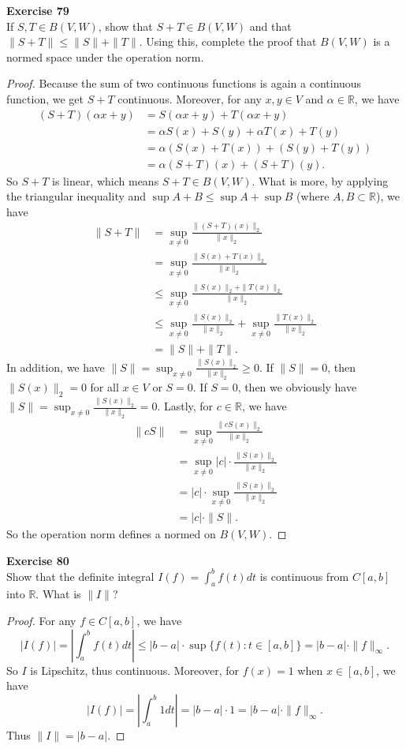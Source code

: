 \documentclass[12pt, a4paper]{article}
\theoremstyle{plain}
\newcommand{\R}{\mathbb{R}}
\newenvironment{exercise}[2][Exercise]
    { \begin{mdframed}[backgroundcolor=gray!20] \textbf{#1 #2} \\}
    {  \end{mdframed}}
\begin{document}
\begin{exercise}{79}
If $S,T\in B(V,W)$, show that $S+T\in B(V,W)$ and that $\|S+T\|\leq \|S\|+\|T\|$. Using this, complete the proof that $B(V,W)$ is a normed space under the operation norm.
\end{exercise}
	\begin{proof}
	Because the sum of two continuous functions is again a continuous function, we get $S+T$ continuous. Moreover, for any $x,y\in V$ and $\alpha\in\R$, we have
	\begin{align*}
	(S+T)(\alpha x+y)&= S(\alpha x+y)+T(\alpha x+y)\\
	&=\alpha S(x)+S(y)+\alpha T(x)+T(y)\\
	&=\alpha (S(x)+T(x))+(S(y)+T(y))\\
	&=\alpha (S+T)(x)+(S+T)(y).
	\end{align*}
	So $S+T$ is linear, which means $S+T\in B(V,W)$. What is more, by applying the triangular inequality and $\sup{A+B}\leq \sup{A}+\sup{B}$ (where $A,B\subset\R$), we have
	\begin{align*}
	\|S+T\|&=\sup_{x\neq 0}{\frac{\|(S+T)(x)\|_2}{\|x\|_2}}\\
	&=\sup_{x\neq 0}{\frac{\|S(x)+T(x)\|_2}{\|x\|_2}}\\
	&\leq \sup_{x\neq 0}{\frac{\|S(x)\|_2+\|T(x)\|_2}{\|x\|_2}}\\
	&\leq \sup_{x\neq 0}{\frac{\|S(x)\|_2}{\|x\|_2}}+\sup_{x\neq 0}{\frac{\|T(x)\|_2}{\|x\|_2}}\\
	&=\|S\|+\|T\|.
	\end{align*}
	In addition, we have $\|S\|=\sup_{x\neq 0}{\frac{\|S(x)\|_2}{\|x\|_2}}\geq 0$. If $\|S\|=0$, then $\|S(x)\|_2=0$ for all $x\in V$ or $S=0$. If $S=0$, then we obviously have $\|S\|=\sup_{x\neq 0}{\frac{\|S(x)\|_2}{\|x\|_2}}= 0$. Lastly, for $c\in \R$, we have 
	\begin{align*}
	\|cS\|&=\sup_{x\neq 0}{\frac{\|cS(x)\|_2}{\|x\|_2}}\\
	&=\sup_{x\neq 0}{|c|\cdot\frac{\|S(x)\|_2}{\|x\|_2}}\\
	&=|c|\cdot\sup_{x\neq 0}{\frac{\|S(x)\|_2}{\|x\|_2}}\\
	&=|c|\cdot\|S\|.
	\end{align*}
	So the operation norm defines a normed on $B(V,W)$.
	\end{proof}

\pagebreak

\begin{exercise}{80}
Show that the definite integral $I(f)=\int_{a}^{b}{f(t)dt}$ is continuous from $C[a,b]$ into $\R$. What is $\|I\|$?
\end{exercise}
	\begin{proof}
	For any $f\in C[a,b]$, we have
	\[
	|I(f)|=\left| \int_{a}^{b}{f(t)dt}\right|\leq |b-a|\cdot\sup\{f(t):t\in [a,b]\}=|b-a|\cdot \|f\|_\infty.
	\]
	So $I$ is Lipschitz, thus continuous. Moreover, for $f(x)=1$ when $x\in[a,b]$, we have 
	\[
	|I(f)|=\left| \int_{a}^{b}{1 dt}\right|=|b-a|\cdot 1=|b-a|\cdot \|f\|_\infty.
	\]
	Thus $\|I\|=|b-a|$.
	\end{proof}
	
\end{document}
